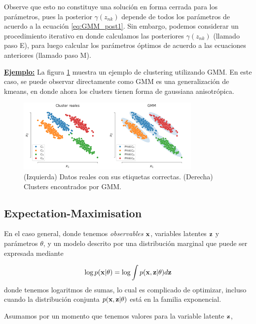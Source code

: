   Observe que esto no constituye una solución en forma cerrada para los parámetros, pues la posterior $\gamma(z_{nk})$ depende de todos los parámetros de acuerdo a la ecuación \eqref{eq:GMM_post1}. Sin embargo, podemos considerar un procedimiento iterativo en donde calculamos las posteriores $\gamma(z_{nk})$ (llamado paso E), para luego calcular los parámetros óptimos de acuerdo a las ecuaciones anteriores (llamado paso M). 



\underline{\textbf{Ejemplo:}} La figura \ref{fig:gmm} muestra un ejemplo de clustering utilizando GMM. En este caso, se puede observar directamente como GMM es una generalización de kmeans, en donde ahora los clusters tienen forma de gaussiana anisotrópica.

\begin{figure}[ht]
  \centering
  \includegraphics[width=0.8\textwidth]{img/cap7_gmm}
  \caption{(Izquierda) Datos reales con sus etiquetas correctas. (Derecha) Clusters encontrados por GMM.}
  \label{fig:gmm}
\end{figure}



\subsection{Expectation-Maximisation} 
\label{sub:GMM_EM}

En el caso general, donde tenemos \emph{observables} $\mathbf{x}$, variables latentes $\mathbf{z}$ y parámetros $\theta$, y un modelo descrito por una distribución marginal que puede ser expresada mediante 

\begin{equation}
	\log p(\mathbf{x}|\theta) = \log \int p(\mathbf{x},\mathbf{z}|\theta)d\mathbf{z}
\end{equation}
donde tenemos logaritmos de sumas, lo cual es complicado de optimizar, incluso cuando la distribución conjunta $p(\mathbf{x},\mathbf{z}|\theta)$ está en la familia exponencial.  

Asumamos por un momento que tenemos valores para la variable latente $\mathbf{z}$,  




